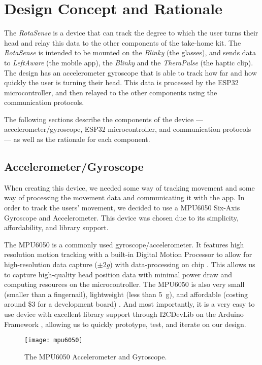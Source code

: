 \chapter{Design Concept and Rationale}
\label{chap:design}

The \textit{RotaSense} is a device that can track the degree to which the user
turns their head and relay this data to the other components of the take-home
kit. The \textit{RotaSense} is intended to be mounted on the \textit{Blinky} (the
glasses), and sends data to \textit{LeftAware} (the mobile app), the
\textit{Blinky} and the \textit{TheraPulse} (the haptic clip). The design has
an accelerometer gyroscope that is able to track how far and how quickly the
user is turning their head. This data is processed by the ESP32
microcontroller, and then relayed to the other components using
the communication protocols. 

The following sections describe the components of the
device --- accelerometer/gyroscope, ESP32 microcontroller, and communication
protocols --- as well as the rationale for each component.

\section{Accelerometer/Gyroscope}\label{sec:mpu6050}

When creating this device, we needed some way of tracking movement and some way
of processing the movement data and communicating it with the app. In order to
track the users’ movement, we decided to use a MPU6050 Six-Axis Gyroscope and
Accelerometer. This device was chosen due to its simplicity, affordability, and
library support.

The MPU6050 is a commonly used gyroscope/accelerometer. It features high
resolution motion tracking with a built-in Digital Motion Processor to allow for
high-resolution data capture ($\pm 2g$) with data-processing on chip
\cite{mpu6050}. This allows us to capture high-quality head position data with
minimal power draw and computing resources on the microcontroller. The MPU6050
is also very small (smaller than a fingernail), lightweight (less than
\qty{5}{\g}), and affordable (costing around \$3 for a development board)
\cite{mpu6050}. And most importantly, it is a very easy to use device with
excellent library support through I2CDevLib \cite{i2cdevlib} on the Arduino
Framework \cite{arduino}, allowing us to quickly prototype, test, and iterate
on our design.

\begin{figure}[h]
  \centering
  \texttt{[image: mpu6050]}
  \caption{The MPU6050 Accelerometer and Gyroscope.}
\end{figure}

